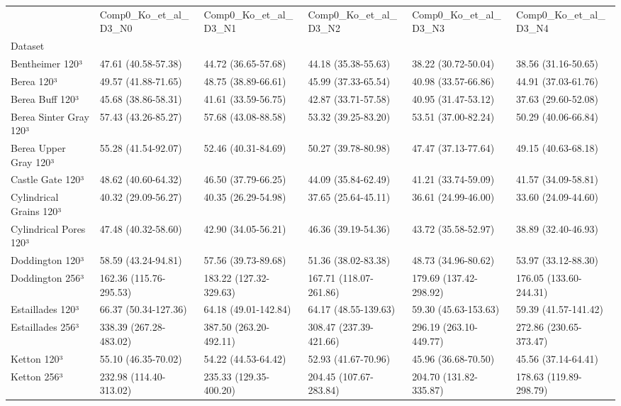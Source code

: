 \begin{tabular}{llllll}
\toprule
 & Comp0_Ko_et_al_D3_N0 & Comp0_Ko_et_al_D3_N1 & Comp0_Ko_et_al_D3_N2 & Comp0_Ko_et_al_D3_N3 & Comp0_Ko_et_al_D3_N4 \\
Dataset &  &  &  &  &  \\
\midrule
Bentheimer 120³ & 47.61 (40.58-57.38) & 44.72 (36.65-57.68) & 44.18 (35.38-55.63) & 38.22 (30.72-50.04) & 38.56 (31.16-50.65) \\
Berea 120³ & 49.57 (41.88-71.65) & 48.75 (38.89-66.61) & 45.99 (37.33-65.54) & 40.98 (33.57-66.86) & 44.91 (37.03-61.76) \\
Berea Buff 120³ & 45.68 (38.86-58.31) & 41.61 (33.59-56.75) & 42.87 (33.71-57.58) & 40.95 (31.47-53.12) & 37.63 (29.60-52.08) \\
Berea Sinter Gray 120³ & 57.43 (43.26-85.27) & 57.68 (43.08-88.58) & 53.32 (39.25-83.20) & 53.51 (37.00-82.24) & 50.29 (40.06-66.84) \\
Berea Upper Gray 120³ & 55.28 (41.54-92.07) & 52.46 (40.31-84.69) & 50.27 (39.78-80.98) & 47.47 (37.13-77.64) & 49.15 (40.63-68.18) \\
Castle Gate 120³ & 48.62 (40.60-64.32) & 46.50 (37.79-66.25) & 44.09 (35.84-62.49) & 41.21 (33.74-59.09) & 41.57 (34.09-58.81) \\
Cylindrical Grains 120³ & 40.32 (29.09-56.27) & 40.35 (26.29-54.98) & 37.65 (25.64-45.11) & 36.61 (24.99-46.00) & 33.60 (24.09-44.60) \\
Cylindrical Pores 120³ & 47.48 (40.32-58.60) & 42.90 (34.05-56.21) & 46.36 (39.19-54.36) & 43.72 (35.58-52.97) & 38.89 (32.40-46.93) \\
Doddington 120³ & 58.59 (43.24-94.81) & 57.56 (39.73-89.68) & 51.36 (38.02-83.38) & 48.73 (34.96-80.62) & 53.97 (33.12-88.30) \\
Doddington 256³ & 162.36 (115.76-295.53) & 183.22 (127.32-329.63) & 167.71 (118.07-261.86) & 179.69 (137.42-298.92) & 176.05 (133.60-244.31) \\
Estaillades 120³ & 66.37 (50.34-127.36) & 64.18 (49.01-142.84) & 64.17 (48.55-139.63) & 59.30 (45.63-153.63) & 59.39 (41.57-141.42) \\
Estaillades 256³ & 338.39 (267.28-483.02) & 387.50 (263.20-492.11) & 308.47 (237.39-421.66) & 296.19 (263.10-449.77) & 272.86 (230.65-373.47) \\
Ketton 120³ & 55.10 (46.35-70.02) & 54.22 (44.53-64.42) & 52.93 (41.67-70.96) & 45.96 (36.68-70.50) & 45.56 (37.14-64.41) \\
Ketton 256³ & 232.98 (114.40-313.02) & 235.33 (129.35-400.20) & 204.45 (107.67-283.84) & 204.70 (131.82-335.87) & 178.63 (119.89-298.79) \\

\end{tabular}
